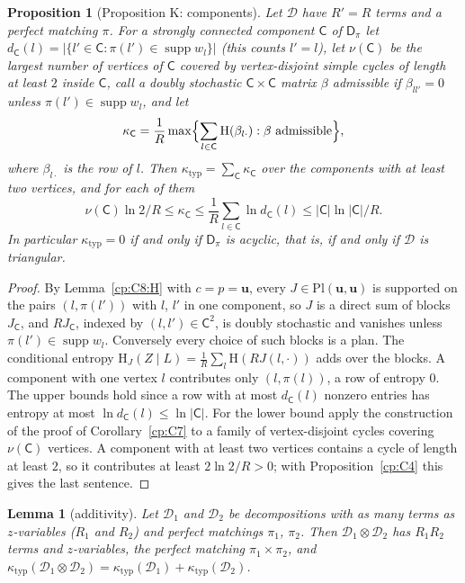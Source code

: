\documentclass[11pt]{article}
\newtheorem{lemma}[theorem]{Lemma}
\newtheorem{proposition}[theorem]{Proposition}
\theoremstyle{definition}
\theoremstyle{remark}
\newcommand{\abs}[1]{\lvert #1\rvert}
\newcommand{\Ent}{\mathrm{H}}                 %
\DeclareMathOperator{\supp}{supp}
\newcommand{\ktyp}{\kappa_{\mathrm{typ}}}    %
\newcommand{\Dpi}{\mathsf D_\pi}             %
\newcommand{\Pl}{\mathrm{Pl}}                %
\newcommand{\unif}{\mathbf u}                %
\begin{document}
\begin{proposition}[Proposition K: components]\label{cp:C8}
Let $\mathcal D$ have $R'=R$ terms and a perfect matching $\pi$. For a strongly connected component $\mathsf C$ of $\Dpi$ let $d_{\mathsf C}(l)=\abs{\{l'\in\mathsf C:\pi(l')\in\supp w_l\}}$ (this counts $l'=l$), let $\nu(\mathsf C)$ be the largest number of vertices of $\mathsf C$ covered by vertex-disjoint simple cycles of length at least $2$ inside $\mathsf C$, call a doubly stochastic $\mathsf C\times\mathsf C$ matrix $\beta$ \emph{admissible} if $\beta_{ll'}=0$ unless $\pi(l')\in\supp w_l$, and let
\[
\kappa_{\mathsf C}=\frac1R\max\Bigl\{\sum_{l\in\mathsf C}\Ent(\beta_{l\cdot}):\beta\text{ admissible}\Bigr\},
\]
where $\beta_{l\cdot}$ is the row of $l$.
Then $\ktyp=\sum_{\mathsf C}\kappa_{\mathsf C}$ over the components with at least two vertices, and for each of them
\[
\nu(\mathsf C)\ln2/R\le\kappa_{\mathsf C}\le\frac1R\sum_{l\in\mathsf C}\ln d_{\mathsf C}(l)\le\abs{\mathsf C}\ln\abs{\mathsf C}/R.
\]
In particular $\ktyp=0$ if and only if $\Dpi$ is acyclic, that is, if and only if $\mathcal D$ is triangular.
\end{proposition}

\begin{proof}
By Lemma~\ref{cp:C8:H} with $c=p=\unif$, every $J\in\Pl(\unif,\unif)$ is supported on the pairs $(l,\pi(l'))$ with $l$, $l'$ in one component, so $J$ is a direct sum of blocks $J_{\mathsf C}$, and $RJ_{\mathsf C}$, indexed by $(l,l')\in\mathsf C^2$, is doubly stochastic and vanishes unless $\pi(l')\in\supp w_l$. Conversely every choice of such blocks is a plan. The conditional entropy $\Ent_J(Z\mid L)=\frac1R\sum_l\Ent(RJ(l,\cdot))$ adds over the blocks. A component with one vertex $l$ contributes only $(l,\pi(l))$, a row of entropy $0$. The upper bounds hold since a row with at most $d_{\mathsf C}(l)$ nonzero entries has entropy at most $\ln d_{\mathsf C}(l)\le\ln\abs{\mathsf C}$. For the lower bound apply the construction of the proof of Corollary~\ref{cp:C7} to a family of vertex-disjoint cycles covering $\nu(\mathsf C)$ vertices. A component with at least two vertices contains a cycle of length at least $2$, so it contributes at least $2\ln2/R>0$; with Proposition~\ref{cp:C4} this gives the last sentence.
\end{proof}

\begin{lemma}[additivity]\label{cp:C8:add}
Let $\mathcal D_1$ and $\mathcal D_2$ be decompositions with as many terms as $z$-variables ($R_1$ and $R_2$) and perfect matchings $\pi_1$, $\pi_2$. Then $\mathcal D_1\otimes\mathcal D_2$ has $R_1R_2$ terms and $z$-variables, the perfect matching $\pi_1\times\pi_2$, and $\ktyp(\mathcal D_1\otimes\mathcal D_2)=\ktyp(\mathcal D_1)+\ktyp(\mathcal D_2)$.
\end{lemma}
\end{document}
